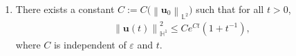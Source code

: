 \documentclass[10pt,a4paper]{amsart}
\newcommand{\bb}{\mathbb}
\newcommand{\bff}{\boldsymbol}
\newcommand{\ds}{\mathrm{d}s}
\newcommand{\norm}[2]{\left\|{#1}\right\|_{#2}}
\begin{document}
\begin{lemma}
\begin{enumerate}
\begin{align}
            \norm{\bff{u}(t)}{\bb{H}^1}^2 
            +
            \int_t^{t+1} \left( \norm{\Delta \bff{u}(s)}{\bb{L}^2}^2 
            + \varepsilon \norm{\nabla\Delta \bff{u}(s)}{\bb{L}^2}^2 + \norm{|\bff{u}(s)| |\nabla \bff{u}(s)|}{\bb{L}^2}^2 \right) \ds
            \leq \widetilde{\rho_1},
        \end{align}
        where $\widetilde{\rho_1}$ is independent of $\bff{u}_0$, $\varepsilon$, and $t$.
    \item There exists a constant $C:= C\big(\norm{\bff{u}_0}{\bb{L}^2}\big)$ such that for all $t>0$,
        \begin{align}\label{equ:M0 u H1}
            \norm{\bff{u}(t)}{\bb{H}^1}^2
            \leq
            Ce^{Ct} \left(1+t^{-1}\right),
        \end{align}
    where $C$ is independent of $\varepsilon$ and $t$.
\end{enumerate}
\end{lemma}
\end{document}
